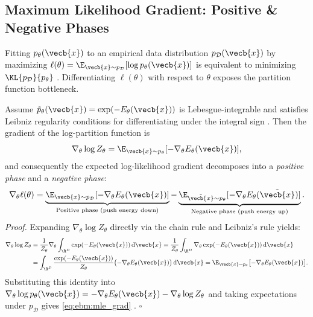\documentclass[../../../../master.tex]{subfiles}
\begin{document}
\subsection{Maximum Likelihood Gradient: Positive \& Negative Phases}
\label{sec:ebm:mle}

Fitting $p_\theta(\vecb{x})$ to an empirical data distribution $p_{\mathcal{D}}(\vecb{x})$ by maximizing $\ell(\theta) = \E_{\vecb{x} \sim p_{\mathcal{D}}}[\log p_\theta(\vecb{x})]$ is equivalent to minimizing $\KL{p_{\mathcal{D}}}{p_\theta}$ . Differentiating $\ell(\theta)$ with respect to $\theta$ exposes the partition function bottleneck.

\begin{coremath}
Assume $\tilde{p}_\theta(\vecb{x}) = \exp(-E_\theta(\vecb{x}))$ is Lebesgue-integrable and satisfies Leibniz regularity conditions for differentiating under the integral sign . Then the gradient of the log-partition function is
\begin{equation}
  \nabla_\theta \log Z_\theta = \E_{\vecb{x} \sim p_\theta}[-\nabla_\theta E_\theta(\vecb{x})],
  \label{eq:ebm:logz_grad}
\end{equation}
and consequently the expected log-likelihood gradient decomposes into a \emph{positive phase} and a \emph{negative phase}:
\begin{equation}
  \nabla_\theta \ell(\theta) = \underbrace{\E_{\vecb{x} \sim p_{\mathcal{D}}}[-\nabla_\theta E_\theta(\vecb{x})]}_{\text{Positive phase (push energy down)}} - \underbrace{\E_{\tilde{\vecb{x}} \sim p_\theta}[-\nabla_\theta E_\theta(\tilde{\vecb{x}})]}_{\text{Negative phase (push energy up)}}.
  \label{eq:ebm:mle_grad}
\end{equation}
\textit{Proof.} Expanding $\nabla_\theta \log Z_\theta$ directly via the chain rule and Leibniz's rule yields:
\begin{align*}
  \nabla_\theta \log Z_\theta
  &= \frac{1}{Z_\theta} \nabla_\theta \int_{\R^D} \exp(-E_\theta(\vecb{x})) \, \mathrm{d}\vecb{x}
   = \frac{1}{Z_\theta} \int_{\R^D} \nabla_\theta \exp(-E_\theta(\vecb{x})) \, \mathrm{d}\vecb{x} \\
  &= \int_{\R^D} \frac{\exp(-E_\theta(\vecb{x}))}{Z_\theta} \bigl(-\nabla_\theta E_\theta(\vecb{x})\bigr) \, \mathrm{d}\vecb{x}
   = \E_{\vecb{x} \sim p_\theta}\bigl[-\nabla_\theta E_\theta(\vecb{x})\bigr].
\end{align*}
Substituting this identity into $\nabla_\theta \log p_\theta(\vecb{x}) = -\nabla_\theta E_\theta(\vecb{x}) - \nabla_\theta \log Z_\theta$ and taking expectations under $p_{\mathcal{D}}$ gives \eqref{eq:ebm:mle_grad} . \hfill $\square$
\end{coremath}
\end{document}
